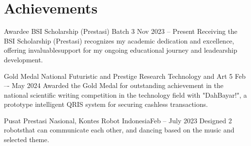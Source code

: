 \section{Achievements}
\resumeSubHeadingListStart
    
    \achiSubheading
    {Awardee BSI Scholarship (Prestasi) Batch 3 }{Nov 2023 -- Present}
    {Receiving the BSI Scholarship (Prestasi) recognizes my academic dedication and excellence, offering invaluablesupport for my ongoing educational journey and leadearship development.}{}

    \achiSubheading
    {Gold Medal National Futuristic and Prestige Research Technology and Art 5 }{Feb –- May 2024}
    {Awarded the Gold Medal for outstanding achievement in the national scientific writing competition in the technology field with "DahBayar!", a prototype intelligent QRIS system for securing cashless transactions.}{}
    
    \achiSubheading
    {Pusat Prestasi Nasional, Kontes Robot Indonesia}{Feb -- July 2023}
    {Designed 2 robotsthat can communicate each other, and dancing based on the music and selected theme.}{}
    \resumeItemListStart
    \resumeItemListEnd

\resumeSubHeadingListEnd